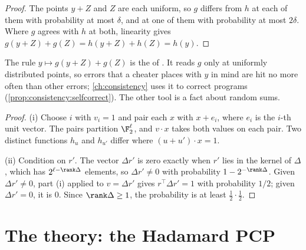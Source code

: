 \begin{refsection}
\begin{proof}
The points $y+Z$ and $Z$ are each uniform, so $g$ differs from $h$ at each of them with probability at most $\delta$, and at one of them with probability at most $2\delta$. Where $g$ agrees with $h$ at both, linearity gives $g(y+Z)+g(Z)=h(y+Z)+h(Z)=h(y)$.
\end{proof}

The rule $y\mapsto g(y+Z)+g(Z)$ is the  of \textcite{BlumLubyRubinfeld1993}. It reads $g$ only at uniformly distributed points, so errors that a cheater places with $y$ in mind are hit no more often than other errors; \cref{ch:consistency} uses it to correct programs (\cref{prop:consistency:selfcorrect}). The other tool is a fact about random sums.


\begin{proof}
(i) Choose $i$ with $v_i=1$ and pair each $x$ with $x+e_i$, where $e_i$ is the $i$-th unit vector. The pairs partition $\F_2^\ell$, and $v\cdot x$ takes both values on each pair. Two distinct functions $h_u$ and $h_{u'}$ differ where $(u+u')\cdot x=1$.

(ii) Condition on $r'$. The vector $\Delta r'$ is zero exactly when $r'$ lies in the kernel of $\Delta$, which has $2^{\ell-\rank\Delta}$ elements, so $\Delta r'\ne0$ with probability $1-2^{-\rank\Delta}$. Given $\Delta r'\ne0$, part (i) applied to $v=\Delta r'$ gives $r^\top\Delta r'=1$ with probability $1/2$; given $\Delta r'=0$, it is $0$. Since $\rank\Delta\ge1$, the probability is at least $\frac12\cdot\frac12$.
\end{proof}

\section{The theory: the Hadamard PCP}\label{sec:spotchecks:hadamard}


\end{refsection}
